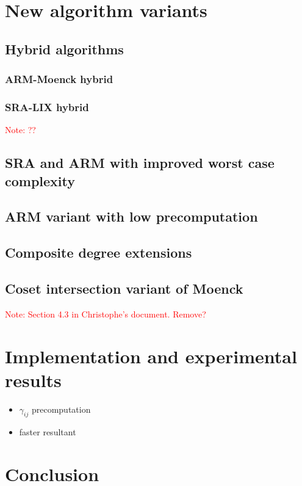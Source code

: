 \documentclass{article}
\newcounter{algo}
\newcommand{\Notes}[1]{\textcolor{red}{Note: #1}}
\begin{document}
\section{New algorithm variants}
\label{sec:new-variants}

\subsection{Hybrid algorithms}
\label{sec:hybrid-algorithms}

\subsubsection{ARM-Moenck hybrid}
\subsubsection{SRA-LIX hybrid}
\Notes{??}



\subsection{SRA and ARM with improved worst case complexity}
\label{sec:worst-case}


\subsection{ARM variant with low precomputation}
\label{sec:low-precomputation}


\subsection{Composite degree extensions}
\label{sec:composite-degree}


\subsection{Coset intersection variant of Moenck}
\label{sec:SRAMoenck}
\Notes{Section 4.3 in Christophe's document. Remove?}



\section{Implementation and experimental results}
\label{sec:impl-exper-results}

\begin{itemize}
\item $\gamma_{ij}$ precomputation
\item faster resultant
\end{itemize}

\section{Conclusion}
\label{sec:conclusion}





\end{document}
